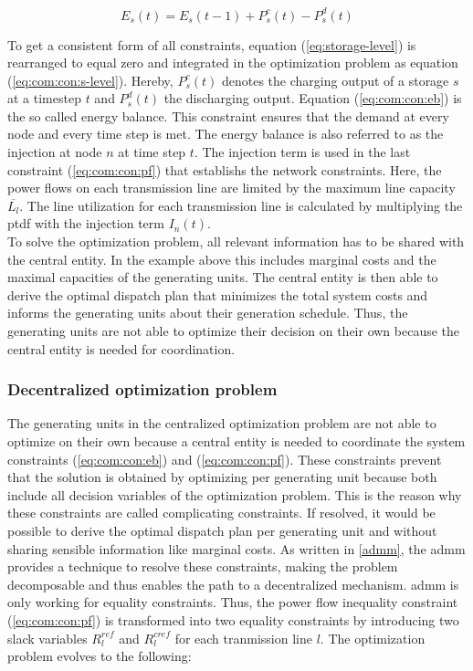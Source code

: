 \begin{equation}
	\label{eq:storage-level}
	E_s(t) = E_s(t-1) + P_s^c(t) - P_s^d(t)
\end{equation}

To get a consistent form of all constraints, equation (\ref{eq:storage-level}) is rearranged to equal zero and integrated in the optimization problem as equation (\ref{eq:com:con:s-level}). Hereby, $P_s^c(t)$ denotes the charging output of a storage $s$ at a timestep $t$ and $P_s^d(t)$ the discharging output. Equation (\ref{eq:com:con:eb}) is the so called energy balance. This constraint ensures that the demand at every node and every time step is met. The energy balance is also referred to as the injection at node $n$ at time step $t$. The injection term is used in the last constraint (\ref{eq:com:con:pf}) that establishs the network constraints. Here, the power flows on each transmission line are limited by the maximum line capacity $\overline{L_l}$. The line utilization for each transmission line is calculated by multiplying the \gls{ptdf} with the injection term $I_n(t)$.\\

	
To solve the optimization problem, all relevant information has to be shared with the central entity. In the example above this includes marginal costs and the maximal capacities of the generating units. The central entity is then able to derive the optimal dispatch plan that minimizes the total system costs and informs the generating units about their generation schedule. Thus, the generating units are not able to optimize their decision on their own because the central entity is needed for coordination.	

\subsubsection{Decentralized optimization problem}

The generating units in the centralized optimization problem are not able to optimize on their own because a central entity is needed to coordinate the system constraints (\ref{eq:com:con:eb}) and (\ref{eq:com:con:pf}). These constraints prevent that the solution is obtained by optimizing per generating unit because both include all decision variables of the optimization problem. This is the reason why these constraints are called complicating constraints. If resolved, it would be possible to derive the optimal dispatch plan per generating unit and without sharing sensible information like marginal costs. As written in \ref{admm}, the \gls{admm} provides a technique to resolve these constraints, making the problem decomposable and thus enables the path to a decentralized mechanism. \gls{admm} is only working for equality constraints. Thus, the power flow inequality constraint (\ref{eq:com:con:pf}) is transformed into two equality constraints by introducing two slack variables $R^{ref}_l$ and $R^{cref}_l$ for each tranmission line $l$. The optimization problem evolves to the following:

